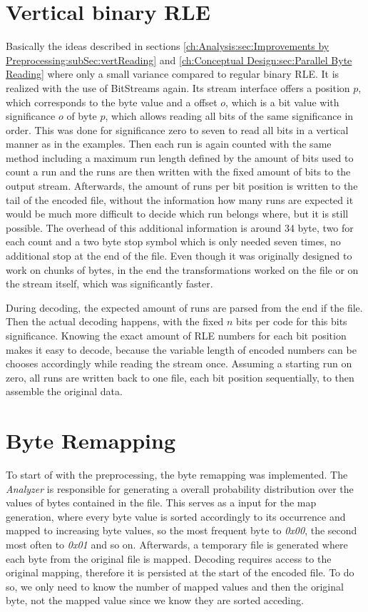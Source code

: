 \section{Vertical binary RLE}
\par{
	Basically the ideas described in sections \ref{ch:Analysis:sec:Improvements by Preprocessing:subSec:vertReading} and \ref{ch:Conceptual Design:sec:Parallel Byte Reading} where only a small variance compared to regular binary RLE. It is realized with the use of BitStreams again. Its stream interface offers a position $p$, which corresponds to the byte value and a offset $o$, which is a bit value with significance $o$ of byte $p$, which allows reading all bits of the same significance in order. This was done for significance zero to seven to read all bits in a vertical manner as in the examples. Then each run is again counted with the same method including a maximum run length defined by the amount of bits used to count a run and the runs are then written with the fixed amount of bits to the output stream. Afterwards, the amount of runs per bit position is written to the tail of the encoded file, without the information how many runs are expected it would be much more difficult to decide which run belongs where, but it is still possible. The overhead of this additional information is around 34 byte, two for each count and a two byte stop symbol which is only needed seven times, no additional stop at the end of the file. Even though it was originally designed to work on chunks of bytes, in the end the transformations worked on the file or on the stream itself, which was significantly faster.
}
\par{
	During decoding, the expected amount of runs are parsed from the end if the file. Then the actual decoding happens, with the fixed $n$ bits per code for this bits significance. Knowing the exact amount of RLE numbers for each bit position makes it easy to decode, because the variable length of encoded numbers can be chooses accordingly while reading the stream once. Assuming a starting run on zero, all runs are written back to one file, each bit position sequentially, to then assemble the original data.
}
\section{Byte Remapping}
\par{
	To start of with the preprocessing, the byte remapping was implemented. The \emph{Analyzer} is responsible for generating a overall probability distribution over the values of bytes contained in the file. This serves as a input for the map generation, where every byte value is sorted accordingly to its occurrence and mapped to increasing byte values, so the most frequent byte to \textit{0x00}, the second most often to \textit{0x01} and so on. Afterwards, a temporary file is generated where each byte from the original file is mapped. Decoding requires access to the original mapping, therefore it is persisted at the start of the encoded file. To do so, we only need to know the number of mapped values and then the original byte, not the mapped value since we know they are sorted acceding.  
}
